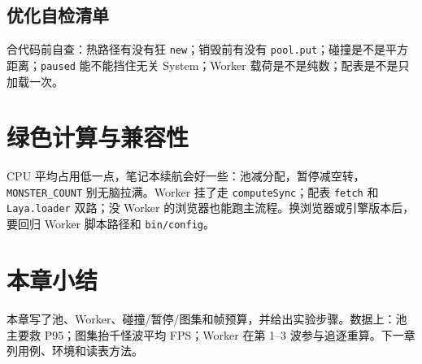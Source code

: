 \subsection{优化自检清单}

合代码前自查：热路径有没有狂 \texttt{new}；销毁前有没有 \texttt{pool.put}；碰撞是不是平方距离；\texttt{paused} 能不能挡住无关 System；Worker 载荷是不是纯数；配表是不是只加载一次。

\section{绿色计算与兼容性}

CPU 平均占用低一点，笔记本续航会好一些：池减分配，暂停减空转，\texttt{MONSTER\_COUNT} 别无脑拉满。Worker 挂了走 \texttt{computeSync}；配表 \texttt{fetch} 和 \texttt{Laya.loader} 双路；没 Worker 的浏览器也能跑主流程。换浏览器或引擎版本后，要回归 Worker 脚本路径和 \texttt{bin/config}。

\section{本章小结}

本章写了池、Worker、碰撞/暂停/图集和帧预算，并给出实验步骤。数据上：池主要救 P95；图集抬千怪波平均 FPS；Worker 在第 1--3 波参与追逐重算。下一章列用例、环境和读表方法。
